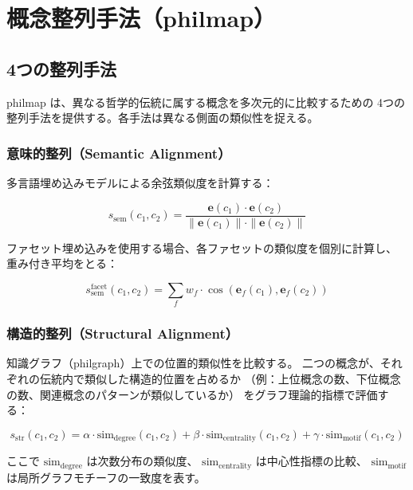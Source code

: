 \documentclass[a4paper,11pt]{ltjsarticle}
\begin{document}
\section{概念整列手法（philmap）}\label{sec:philmap}

\subsection{4つの整列手法}

philmap は、異なる哲学的伝統に属する概念を多次元的に比較するための
4つの整列手法を提供する。各手法は異なる側面の類似性を捉える。

\subsubsection{意味的整列（Semantic Alignment）}

多言語埋め込みモデルによる余弦類似度を計算する：

\begin{equation}\label{eq:semantic}
  s_{\text{sem}}(c_1, c_2) = \frac{\mathbf{e}(c_1) \cdot \mathbf{e}(c_2)}{\|\mathbf{e}(c_1)\| \cdot \|\mathbf{e}(c_2)\|}
\end{equation}

ファセット埋め込みを使用する場合、各ファセットの類似度を個別に計算し、
重み付き平均をとる：

\begin{equation}\label{eq:semantic-faceted}
  s_{\text{sem}}^{\text{facet}}(c_1, c_2) = \sum_{f} w_f \cdot \cos(\mathbf{e}_f(c_1), \mathbf{e}_f(c_2))
\end{equation}

\subsubsection{構造的整列（Structural Alignment）}

知識グラフ（philgraph）上での位置的類似性を比較する。
二つの概念が、それぞれの伝統内で類似した構造的位置を占めるか
（例：上位概念の数、下位概念の数、関連概念のパターンが類似しているか）
をグラフ理論的指標で評価する：

\begin{equation}\label{eq:structural}
  s_{\text{str}}(c_1, c_2) = \alpha \cdot \text{sim}_{\text{degree}}(c_1, c_2) + \beta \cdot \text{sim}_{\text{centrality}}(c_1, c_2) + \gamma \cdot \text{sim}_{\text{motif}}(c_1, c_2)
\end{equation}

ここで $\text{sim}_{\text{degree}}$ は次数分布の類似度、
$\text{sim}_{\text{centrality}}$ は中心性指標の比較、
$\text{sim}_{\text{motif}}$ は局所グラフモチーフの一致度を表す。
\end{document}
